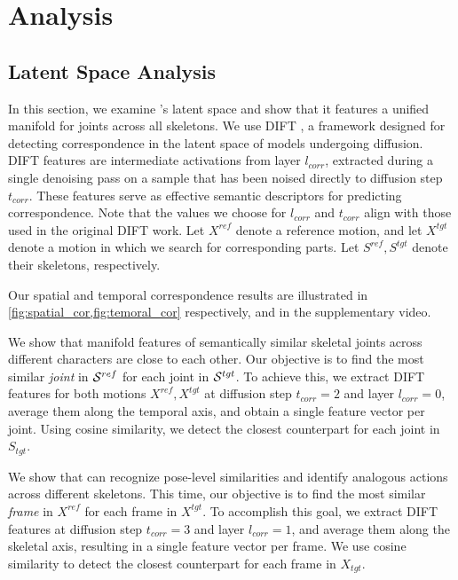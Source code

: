 \section{Analysis}\label{sec:analysis}

\subsection{Latent Space Analysis}
In this section, we examine \algoname's latent space and show that it features a unified manifold for joints across all skeletons.
We use DIFT \cite{tang2023emergent}, a framework designed for detecting correspondence in the latent space of models undergoing diffusion.
DIFT features are intermediate activations from layer $l_{corr}$, extracted during a single denoising pass on a sample that has been noised directly to diffusion step $t_{corr}$. These features serve as effective semantic descriptors for predicting correspondence.
Note that the values we choose for $l_{corr}$ and $t_{corr}$ align with those used in the original DIFT work.
Let $X^{ref}$ denote a reference motion, and let $X^{tgt}$ denote a motion in which we search for corresponding parts.
Let $S^{ref}, S^{tgt}$ denote their skeletons, respectively.

Our spatial and temporal correspondence results are illustrated in \cref{fig:spatial_cor,fig:temoral_cor} respectively, and in the supplementary video.


We show that manifold features of semantically similar skeletal joints across different characters are close to each other.
Our objective is to find the most similar \emph{joint} in $\mathcal{S}^{ref}$ for each joint in $\mathcal{S}^{tgt}$.
To achieve this, we extract DIFT features for both motions $X^{ref}, X^{tgt}$ at diffusion step $t_{corr} = 2$ and layer $l_{corr} = 0$, average them along the temporal axis, and obtain a single feature vector per joint.
Using cosine similarity, we detect the closest counterpart for each joint in $S_{tgt}$. 



We show that \algoname can recognize pose-level similarities and identify analogous actions across different skeletons.
This time, our objective is to find the most similar \emph{frame} in $X^{ref}$ for each frame in $X^{tgt}$.
To accomplish this goal, we extract DIFT features at diffusion step $t_{corr}=3$ and layer $l_{corr}=1$, and average them along the skeletal axis, resulting in a single feature vector per frame.
We use cosine similarity to detect the closest counterpart for each frame in $X_{tgt}$. 

